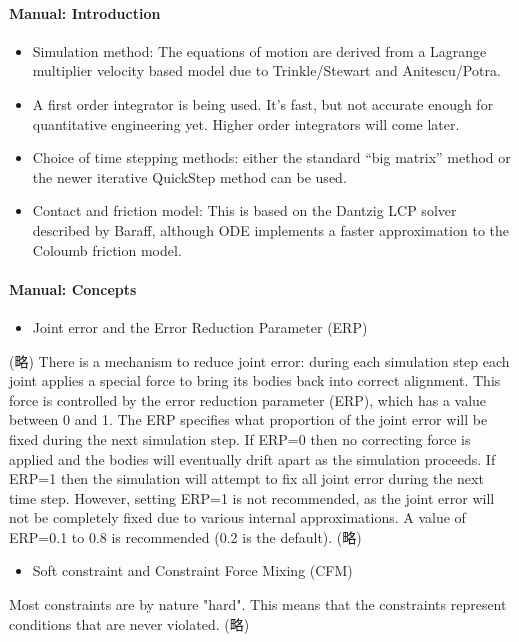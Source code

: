 \documentclass{jsarticle}
\begin{document}
\paragraph{\cite{WebODEWiki} Manual: Introduction}
\begin{itemize}
 \item Simulation method: The equations of motion are derived from a Lagrange multiplier velocity based model due to Trinkle/Stewart and Anitescu/Potra.
 \item A first order integrator is being used. It's fast, but not accurate enough for quantitative engineering yet. Higher order integrators will come later.
 \item Choice of time stepping methods: either the standard ``big matrix'' method or the newer iterative QuickStep method can be used.
 \item Contact and friction model: This is based on the Dantzig LCP solver described by Baraff, although ODE implements a faster approximation to the Coloumb friction model.
\end{itemize}

\paragraph{\cite{WebODEWiki} Manual: Concepts}
\begin{itemize}
 \item Joint error and the Error Reduction Parameter (ERP)
\end{itemize}
(略)
There is a mechanism to reduce joint error: during each simulation step each joint applies a special force to bring its bodies back into correct alignment. This force is controlled by the error reduction parameter (ERP), which has a value between 0 and 1.
The ERP specifies what proportion of the joint error will be fixed during the next simulation step. If ERP=0 then no correcting force is applied and the bodies will eventually drift apart as the simulation proceeds. If ERP=1 then the simulation will attempt to fix all joint error during the next time step. However, setting ERP=1 is not recommended, as the joint error will not be completely fixed due to various internal approximations. A value of ERP=0.1 to 0.8 is recommended (0.2 is the default).
(略)
\begin{itemize}
 \item Soft constraint and Constraint Force Mixing (CFM)
\end{itemize}
Most constraints are by nature "hard". This means that the constraints represent conditions that are never violated. (略)
\end{document}
